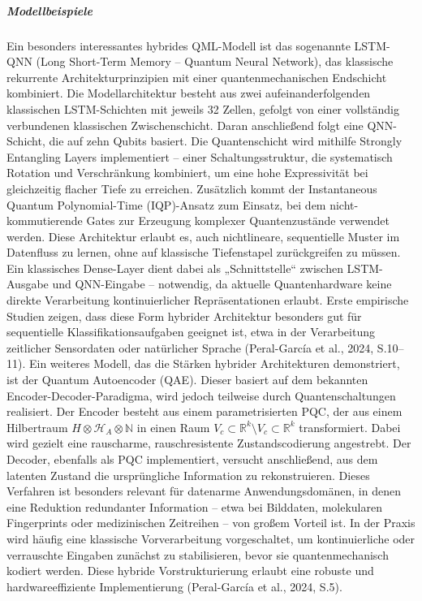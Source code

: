 \subparagraph{Modellbeispiele}
Ein besonders interessantes hybrides QML-Modell ist das sogenannte LSTM-QNN (Long Short-Term Memory – Quantum Neural Network), das klassische rekurrente Architekturprinzipien mit einer quantenmechanischen Endschicht kombiniert. Die Modellarchitektur besteht aus zwei aufeinanderfolgenden klassischen LSTM-Schichten mit jeweils 32 Zellen, gefolgt von einer vollständig verbundenen klassischen Zwischenschicht. Daran anschließend folgt eine QNN-Schicht, die auf zehn Qubits basiert.
Die Quantenschicht wird mithilfe Strongly Entangling Layers implementiert – einer Schaltungsstruktur, die systematisch Rotation und Verschränkung kombiniert, um eine hohe Expressivität bei gleichzeitig flacher Tiefe zu erreichen. Zusätzlich kommt der Instantaneous Quantum Polynomial-Time (IQP)-Ansatz zum Einsatz, bei dem nicht-kommutierende Gates zur Erzeugung komplexer Quantenzustände verwendet werden. Diese Architektur erlaubt es, auch nichtlineare, sequentielle Muster im Datenfluss zu lernen, ohne auf klassische Tiefenstapel zurückgreifen zu müssen.
Ein klassisches Dense-Layer dient dabei als „Schnittstelle“ zwischen LSTM-Ausgabe und QNN-Eingabe – notwendig, da aktuelle Quantenhardware keine direkte Verarbeitung kontinuierlicher Repräsentationen erlaubt. Erste empirische Studien zeigen, dass diese Form hybrider Architektur besonders gut für sequentielle Klassifikationsaufgaben geeignet ist, etwa in der Verarbeitung zeitlicher Sensordaten oder natürlicher Sprache (Peral-García et al., 2024, S.10–11).
Ein weiteres Modell, das die Stärken hybrider Architekturen demonstriert, ist der Quantum Autoencoder (QAE). Dieser basiert auf dem bekannten Encoder-Decoder-Paradigma, wird jedoch teilweise durch Quantenschaltungen realisiert. Der Encoder besteht aus einem parametrisierten PQC, der aus einem Hilbertraum $H \otimes \mathcal{H}_A \otimes \mathbb{N}$ in einen Raum $V_c \subset \mathbb{R}^k \setminus V_c \subset \mathbb{R}^k$ transformiert. Dabei wird gezielt eine rauscharme, rauschresistente Zustandscodierung angestrebt.
Der Decoder, ebenfalls als PQC implementiert, versucht anschließend, aus dem latenten Zustand die ursprüngliche Information zu rekonstruieren. Dieses Verfahren ist besonders relevant für datenarme Anwendungsdomänen, in denen eine Reduktion redundanter Information – etwa bei Bilddaten, molekularen Fingerprints oder medizinischen Zeitreihen – von großem Vorteil ist.
In der Praxis wird häufig eine klassische Vorverarbeitung vorgeschaltet, um kontinuierliche oder verrauschte Eingaben zunächst zu stabilisieren, bevor sie quantenmechanisch kodiert werden. Diese hybride Vorstrukturierung erlaubt eine robuste und hardwareeffiziente Implementierung (Peral-García et al., 2024, S.5).
